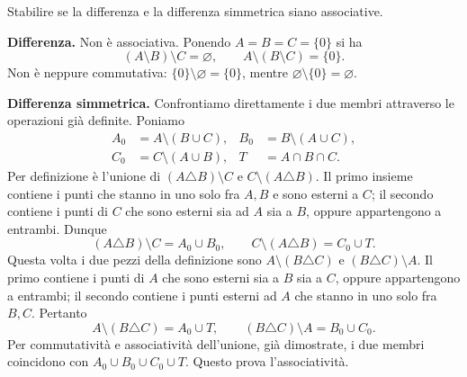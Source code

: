 \begin{esercizio}
Stabilire se la differenza e la differenza simmetrica siano associative.
\end{esercizio}
\begin{svolgimento}
\textbf{Differenza.} Non è associativa. Ponendo $A=B=C=\{0\}$ si ha
\[
(A\setminus B)\setminus C=\varnothing,
\qquad A\setminus(B\setminus C)=\{0\}.
\]
Non è neppure commutativa: $\{0\}\setminus\varnothing=\{0\}$, mentre $\varnothing\setminus\{0\}=\varnothing$.

\textbf{Differenza simmetrica.} Confrontiamo direttamente i due membri attraverso le operazioni già definite. Poniamo
\[
\begin{aligned}
A_0&=A\setminus(B\cup C),& B_0&=B\setminus(A\cup C),\\
C_0&=C\setminus(A\cup B),& T&=A\cap B\cap C.
\end{aligned}
\]
 Per definizione è l'unione di $(A\triangle B)\setminus C$ e $C\setminus(A\triangle B)$. Il primo insieme contiene i punti che stanno in uno solo fra $A,B$ e sono esterni a $C$; il secondo contiene i punti di $C$ che sono esterni sia ad $A$ sia a $B$, oppure appartengono a entrambi. Dunque
\[
(A\triangle B)\setminus C=A_0\cup B_0,
\qquad C\setminus(A\triangle B)=C_0\cup T.
\]
 Questa volta i due pezzi della definizione sono $A\setminus(B\triangle C)$ e $(B\triangle C)\setminus A$. Il primo contiene i punti di $A$ che sono esterni sia a $B$ sia a $C$, oppure appartengono a entrambi; il secondo contiene i punti esterni ad $A$ che stanno in uno solo fra $B,C$. Pertanto
\[
A\setminus(B\triangle C)=A_0\cup T,
\qquad (B\triangle C)\setminus A=B_0\cup C_0.
\]
Per commutatività e associatività dell'unione, già dimostrate, i due membri coincidono con $A_0\cup B_0\cup C_0\cup T$. Questo prova l'associatività.
\end{svolgimento}

\begin{schema}
\end{schema}

